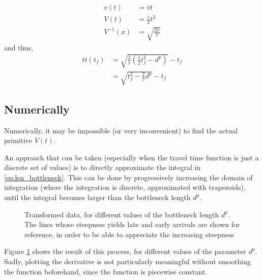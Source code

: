 \documentclass{article}
\begin{document}
\begin{align*}
  v(t) & = \bar{v}t \\
  V(t) & = \frac{\bar{v}}{2}t^2 \\
  V^{-1}(x) & = \sqrt{\frac{2x}{\bar{v}}}
\end{align*}
and thus,
\begin{align*}
  tt(t_f) & = \sqrt{\frac{2}{\bar{v}}\left(\frac{\bar{v}}{2}t_f^2 - d^p\right)} - t_f \\
  & = \sqrt{t_f^2 - \frac{2}{\bar{v}}d^p} - t_f
\end{align*}

\subsection{Numerically}

Numerically, it may be impossible (or very inconvenient) to find the actual primitive \(V(t)\).

An approach that can be taken (especially when the travel time function is just a discrete set of values) is to directly approximate the integral in \eqref{eq:len_bottleneck}.
This can be done by progressively increasing the domain of integration (where the integration is discrete, approximated with trapezoids),
until the integral becomes larger than the bottleneck length \(d^p\).

\begin{figure}
  \centering
  \caption{Transformed data, for different values of the bottleneck length $d^p$. The lines whose steepness yields late and early arrivals are shown for reference, in order to be able to appreciate the increasing steepness}
  \label{fig:modifying_data}
\end{figure}

Figure \ref{fig:modifying_data} shows the result of this process, for different values of the parameter \(d^p\).
Sadly, plotting the derivative is not particularly meaningful without smoothing the function beforehand,
since the function is piecewise constant.
\end{document}
